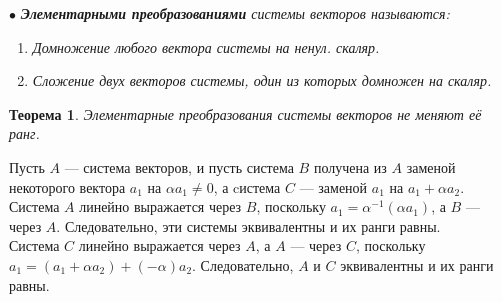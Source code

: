 $\bullet$\textit{\textbf{ Элементарными преобразованиями} системы векторов называются:}\begin{enumerate}
	\item \textit{Домножение любого вектора системы на ненул. скаляр.}
	\item \textit{Сложение двух векторов системы, один из которых домножен на скаляр.}
\end{enumerate}
\newtheorem*{th6_1}{Теорема}\begin{th6_1}Элементарные преобразования системы векторов не меняют её ранг.\end{th6_1}
\begin{Proof} Пусть $A$ --- система векторов, и пусть система $B$ получена из $A$ заменой некоторого вектора $a_1$ на $\alpha a_1 \ne 0$, а cистема $C$ --- заменой $a_1$ на $a_1 + \alpha a_2$. Система $A$ линейно выражается через $B$, поскольку $a_1 = \alpha^{-1}(\alpha a_1)$, а $B$ --- через $A$. Следовательно, эти системы эквивалентны и их ранги равны. \\Система $C$ линейно выражается через $A$, а $A$ --- через $C$, поскольку $a_1 = (a_1 + \alpha a_2) + (-\alpha) a_2$. Следовательно, $A$ и $C$ эквивалентны и их ранги равны.
\end{Proof}




















